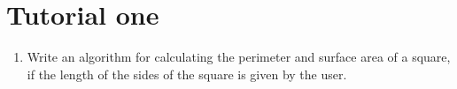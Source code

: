 \documentclass[]{book}
\begin{document}
\section{Tutorial one}
\begin{enumerate}
    \item Write an algorithm for calculating the perimeter and surface area of a square, if the length of the sides of the square is given by the user.

\end{enumerate}
\end{document}

